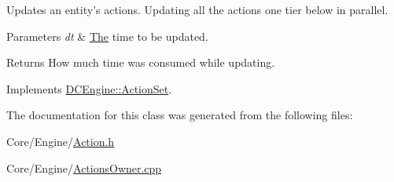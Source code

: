 Updates an entity's actions. Updating all the actions one tier below in parallel. 


\begin{DoxyParams}{Parameters}
{\em dt} & \hyperlink{classThe}{The} time to be updated. \\
\hline
\end{DoxyParams}
\begin{DoxyReturn}{Returns}
How much time was consumed while updating. 
\end{DoxyReturn}


Implements \hyperlink{classDCEngine_1_1ActionSet}{D\-C\-Engine\-::\-Action\-Set}.



The documentation for this class was generated from the following files\-:\begin{DoxyCompactItemize}
\item 
Core/\-Engine/\hyperlink{Action_8h}{Action.\-h}\item 
Core/\-Engine/\hyperlink{ActionsOwner_8cpp}{Actions\-Owner.\-cpp}\end{DoxyCompactItemize}
